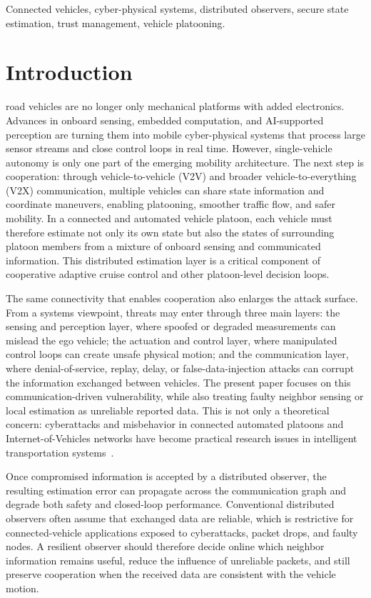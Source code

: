 \documentclass[journal,twoside]{IEEEtran}
\begin{document}
\begin{IEEEkeywords}
Connected vehicles, cyber-physical systems, distributed observers, secure state estimation, trust management, vehicle platooning.
\end{IEEEkeywords}

\section{Introduction}\label{sec_introduction}
 road vehicles are no longer only mechanical platforms with added electronics. Advances in onboard sensing, embedded computation, and AI-supported perception are turning them into mobile cyber-physical systems that process large sensor streams and close control loops in real time. However, single-vehicle autonomy is only one part of the emerging mobility architecture. The next step is cooperation: through vehicle-to-vehicle (V2V) and broader vehicle-to-everything (V2X) communication, multiple vehicles can share state information and coordinate maneuvers, enabling platooning, smoother traffic flow, and safer mobility. In a connected and automated vehicle platoon, each vehicle must therefore estimate not only its own state but also the states of surrounding platoon members from a mixture of onboard sensing and communicated information. This distributed estimation layer is a critical component of cooperative adaptive cruise control and other platoon-level decision loops.

The same connectivity that enables cooperation also enlarges the attack surface. From a systems viewpoint, threats may enter through three main layers: the sensing and perception layer, where spoofed or degraded measurements can mislead the ego vehicle; the actuation and control layer, where manipulated control loops can create unsafe physical motion; and the communication layer, where denial-of-service, replay, delay, or false-data-injection attacks can corrupt the information exchanged between vehicles. The present paper focuses on this communication-driven vulnerability, while also treating faulty neighbor sensing or local estimation as unreliable reported data. This is not only a theoretical concern: cyberattacks and misbehavior in connected automated platoons and Internet-of-Vehicles networks have become practical research issues in intelligent transportation systems~\cite{C_IDM,mousavinejad2019distributed,siddiqui2023trust_vehicles}.

Once compromised information is accepted by a distributed observer, the resulting estimation error can propagate across the communication graph and degrade both safety and closed-loop performance. Conventional distributed observers often assume that exchanged data are reliable, which is restrictive for connected-vehicle applications exposed to cyberattacks, packet drops, and faulty nodes. A resilient observer should therefore decide online which neighbor information remains useful, reduce the influence of unreliable packets, and still preserve cooperation when the received data are consistent with the vehicle motion.
\end{document}
